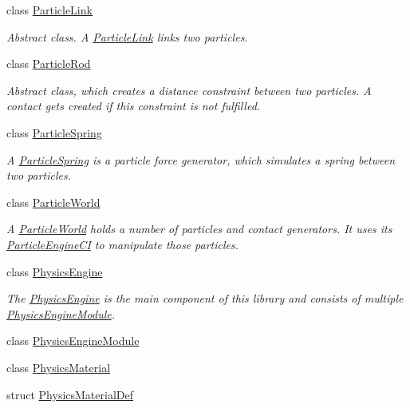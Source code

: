 \begin{DoxyCompactItemize}
class \mbox{\hyperlink{classr3_1_1_particle_link}{Particle\+Link}}
\begin{DoxyCompactList}\small\item\em Abstract class. A \mbox{\hyperlink{classr3_1_1_particle_link}{Particle\+Link}} links two particles. \end{DoxyCompactList}\item 
class \mbox{\hyperlink{classr3_1_1_particle_rod}{Particle\+Rod}}
\begin{DoxyCompactList}\small\item\em Abstract class, which creates a distance constraint between two particles. A contact gets created if this constraint is not fulfilled. \end{DoxyCompactList}\item 
class \mbox{\hyperlink{classr3_1_1_particle_spring}{Particle\+Spring}}
\begin{DoxyCompactList}\small\item\em A \mbox{\hyperlink{classr3_1_1_particle_spring}{Particle\+Spring}} is a particle force generator, which simulates a spring between two particles. \end{DoxyCompactList}\item 
class \mbox{\hyperlink{classr3_1_1_particle_world}{Particle\+World}}
\begin{DoxyCompactList}\small\item\em A \mbox{\hyperlink{classr3_1_1_particle_world}{Particle\+World}} holds a number of particles and contact generators. It uses its \mbox{\hyperlink{classr3_1_1_particle_engine_c_i}{Particle\+Engine\+CI}} to manipulate those particles. \end{DoxyCompactList}\item 
class \mbox{\hyperlink{classr3_1_1_physics_engine}{Physics\+Engine}}
\begin{DoxyCompactList}\small\item\em The \mbox{\hyperlink{classr3_1_1_physics_engine}{Physics\+Engine}} is the main component of this library and consists of multiple \mbox{\hyperlink{classr3_1_1_physics_engine_module}{Physics\+Engine\+Module}}. \end{DoxyCompactList}\item 
class \mbox{\hyperlink{classr3_1_1_physics_engine_module}{Physics\+Engine\+Module}}
\item 
class \mbox{\hyperlink{classr3_1_1_physics_material}{Physics\+Material}}
\item 
struct \mbox{\hyperlink{structr3_1_1_physics_material_def}{Physics\+Material\+Def}}

\end{DoxyCompactItemize}
